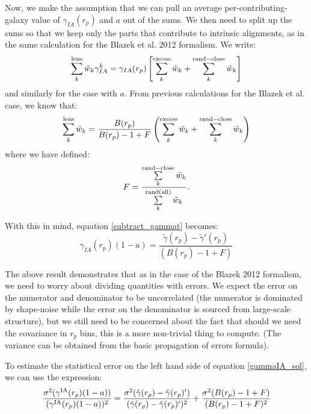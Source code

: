 \documentclass[onecolumn,amsmath,aps,fleqn, superscriptaddress]{revtex4}
\begin{document}
Now, we make the assumption that we can pull an average per-contributing-galaxy value of $\gamma_{IA}(r_p)$ and $a$ out of the sums. We then need to split up the sums so that we keep only the parts that contribute to intrinsic alignments, as in the same calculation for the Blazek et al. 2012 formalism. We write:
\begin{equation}
\sum\limits_{k}^{\rm lens} \tilde{w}_k \gamma_{IA}^k = \gamma_{IA}(r_p) \left[ \sum\limits_{k}^{\rm excess} \tilde{w}_k + \sum\limits_{k}^{\rm rand-close} \tilde{w}_k\right] 
\label{pull_gamma}
\end{equation}
and similarly for the case with $a$. From previous calculations for the Blazek et al. case, we know that:
\begin{equation}
\sum\limits_{k}^{\rm lens} \tilde{w}_k = \frac{B(r_p)}{B(r_p)-1+F} \left(\sum\limits_{k}^{\rm excess} \tilde{w}_k + \sum\limits_{k}^{\rm rand-close} \tilde{w}_k\right)
\label{lens_weights_expand}
\end{equation}
where we have defined:
\begin{equation}
F = \frac{\sum\limits^{\rm rand-close}_{k} \tilde{w}_k}{\sum\limits^{\rm rand(all)}_{k} \tilde{w}_k}.
\label{Frp}
\end{equation}

With this in mind, equation \ref{subtract_gammat} becomes:
\begin{equation}
\gamma_{IA}(r_p)(1-a) = \frac{\tilde{\gamma}(r_p) - \tilde{\gamma}'(r_p)}{(B(r_p)-1+F)}
\label{gammaIA_sol}
\end{equation}

The above result demonstrates that as in the case of the Blazek 2012 formalism, we need to worry about dividing quantities with errors. We expect the error on the numerator and denominator to be uncorrelated (the numerator is dominated by shape-noise while the error on the denominator is sourced from large-scale structure), but we still need to be concerned about the fact that should we need the covariance in $r_p$ bins, this is a more non-trivial thing to compute. (The variance can be obtained from the basic propagation of errors formula).

To estimate the statistical error on the left hand side of equation \ref{gammaIA_sol}, we can use the expression:
\begin{equation}
\frac{\sigma^2(\gamma^{\rm IA}(r_p)(1-a))}{(\gamma^{\rm IA}(r_p)(1-a))^2} = \frac{\sigma^2(\tilde{\gamma}(r_p) - \tilde{\gamma}(r_p)^\prime)}{(\tilde{\gamma}(r_p) - \tilde{\gamma}(r_p)^\prime)^2} + \frac{\sigma^2(B(r_p)-1+F)}{(B(r_p)-1+F)^2}
\label{error_gt}
\end{equation}
\end{document}
